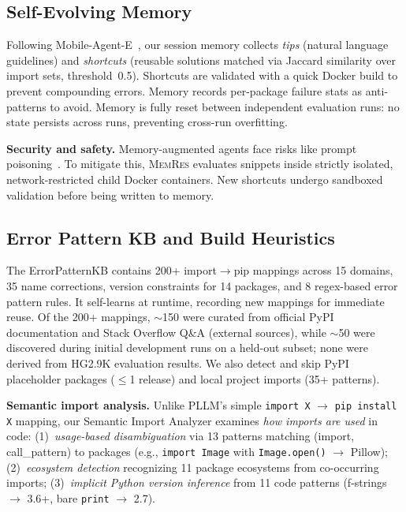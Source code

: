 \documentclass[sigconf,screen]{acmart}
\begin{document}
\subsection{Self-Evolving Memory}
\label{sec:memory}

Following Mobile-Agent-E~\cite{wang2025}, our session memory collects \emph{tips} (natural language guidelines) and \emph{shortcuts} (reusable solutions matched via Jaccard similarity over import sets, threshold~0.5).
Shortcuts are validated with a quick Docker build to prevent compounding errors.
Memory records per-package failure stats as anti-patterns to avoid.
Memory is fully reset between independent evaluation runs: no state persists across runs, preventing cross-run overfitting.

\textbf{Security and safety.}
Memory-augmented agents face risks like prompt poisoning~\cite{wang2025}.
To mitigate this, \textsc{MemRes} evaluates snippets inside strictly isolated, network-restricted child Docker containers.
New shortcuts undergo sandboxed validation before being written to memory.

\subsection{Error Pattern KB and Build Heuristics}
\label{sec:kb}

The ErrorPatternKB contains 200+ import$\rightarrow$pip mappings across 15 domains, 35 name corrections, version constraints for 14 packages, and 8 regex-based error pattern rules.
It self-learns at runtime, recording new mappings for immediate reuse.
Of the 200+ mappings, $\sim$150 were curated from official PyPI documentation and Stack Overflow Q\&A (external sources), while $\sim$50 were discovered during initial development runs on a held-out subset; none were derived from HG2.9K evaluation results.
We also detect and skip PyPI placeholder packages ($\leq$1 release) and local project imports (35+ patterns).

\textbf{Semantic import analysis.}
Unlike PLLM's simple \texttt{import X} $\rightarrow$ \texttt{pip install X} mapping, our Semantic Import Analyzer examines \emph{how imports are used} in code:
(1)~\emph{usage-based disambiguation} via 13 patterns matching (import, call\_pattern) to packages (e.g., \texttt{import Image} with \texttt{Image.open()} $\to$ Pillow);
(2)~\emph{ecosystem detection} recognizing 11 package ecosystems from co-occurring imports;
(3)~\emph{implicit Python version inference} from 11 code patterns (f-strings $\to$ 3.6+, bare \texttt{print} $\to$ 2.7).
\end{document}
